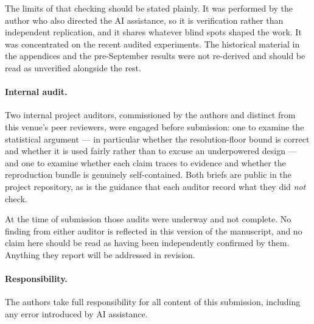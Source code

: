 The limits of that checking should be stated plainly. It was performed by the
author who also directed the AI assistance, so it is verification rather than
independent replication, and it shares whatever blind spots shaped the work.
It was concentrated on the recent audited experiments. The historical material
in the appendices and the pre-September results were not re-derived and should
be read as unverified alongside the rest.

\paragraph{Internal audit.}
Two internal project auditors, commissioned by the authors and distinct from
this venue's peer reviewers, were engaged before submission: one to examine
the statistical argument --- in particular whether the resolution-floor bound
is correct and whether it is used fairly rather than to excuse an underpowered
design --- and one to examine whether each claim traces to evidence and
whether the reproduction bundle is genuinely self-contained. Both briefs are
public in the project repository, as is the guidance that each auditor record
what they did \emph{not} check.

At the time of submission those audits were underway and not complete. No
finding from either auditor is reflected in this version of the manuscript,
and no claim here should be read as having been independently confirmed by
them. Anything they report will be addressed in revision.

\paragraph{Responsibility.}
The authors take full responsibility for all content of this submission,
including any error introduced by AI assistance.

